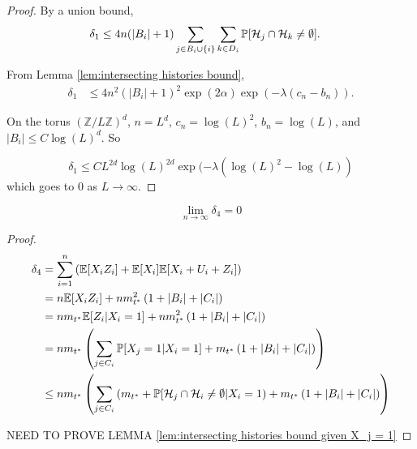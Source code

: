 \begin{proof}
	By a union bound,
	\begin{align}
		\delta_1 &\leq 4 n (|B_i| + 1) \sum_{j \in B_i \cup \{i\}} \sum_{k \in D_i} \mathbb{P}[\mathcal{H}_{j} \cap \mathcal{H}_k \neq \emptyset].
	\end{align}

	From Lemma \ref{lem:intersecting histories bound},
	\begin{align}
		\delta_1 &\leq 4 n^2 (|B_i| + 1)^2 \exp(2\alpha) \exp(-\lambda(c_n - b_n)).
	\end{align}

	On the torus $(\mathbb{Z} / L \mathbb{Z})^d$, $n = L^d$, $c_n = \log(L)^2$, $b_n = \log(L)$, and $|B_i| \leq C \log(L)^d$. So

	\begin{equation}
		\delta_1 \leq C L^{2d} \log(L)^{2d} \exp(-\lambda(\log(L)^2 - \log(L))
	\end{equation}
	which goes to $0$ as $L \rightarrow \infty$.
\end{proof}

\begin{lemma}
\label{lem:delta4 goes to 0 general}
	\begin{equation}
		\lim_{n\rightarrow\infty} \delta_4 = 0
	\end{equation}
\end{lemma}
\begin{proof}
	\begin{align}
		\delta_4 &= \sum_{i = 1}^n \left(\mathbb{E}[X_i Z_i] + \mathbb{E}[X_i]\mathbb{E}[X_i + U_i + Z_i]\right)\\
			&= n \mathbb{E}[X_i Z_i] + n m_{t^*}^2 \left(1 + |B_i| + |C_i|\right)\\
			&= n m_{t^*} \mathbb{E}[Z_i | X_i = 1] + n m_{t^*}^2 \left(1 + |B_i| + |C_i|\right)\\
			&= n m_{t^*} \left(\sum_{j \in C_i} \mathbb{P}[X_j = 1 | X_i = 1] + m_{t^*} \left(1 + |B_i| + |C_i|\right) \right)\\
			&\leq n m_{t^*} \left(\sum_{j \in C_i} \left(m_{t^*} + \mathbb{P}[\mathcal{H}_{j} \cap \mathcal{H}_i \neq \emptyset | X_i = 1\right) + m_{t^*} \left(1 + |B_i| + |C_i|\right) \right)
	\end{align}

	NEED TO PROVE LEMMA \ref{lem:intersecting histories bound given X_j = 1}
\end{proof}

